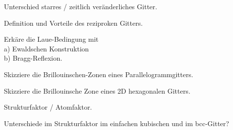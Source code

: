 \documentclass[a5paper,12pt,ngerman,print,grid=front]{kartei}
\begin{document}
	\begin{karte}{
		Unterschied starres / zeitlich veränderliches Gitter.
		}
		
		
		
	\end{karte}


	\begin{karte}{
		Definition und Vorteile des reziproken Gitters.
		}
		
		
		
	\end{karte}


	\begin{karte}{
		Erkäre die Laue-Bedingung mit \\
		a) Ewaldschen Konstruktion \\
		b) Bragg-Reflexion.
		}
		
		
		
	\end{karte}


	\begin{karte}{
		Skizziere die Brillouinschen-Zonen eines Parallelogrammgitters.
		}
		
		
		
	\end{karte}


	\begin{karte}{
		Skizziere die Brillouinsche Zone eines 2D hexagonalen Gitters.
		}
		
		
		
	\end{karte}


	\begin{karte}{
		Strukturfaktor / Atomfaktor.
		}
		
		
		
	\end{karte}


	\begin{karte}{
		Unterschiede im Strukturfaktor im einfachen kubischen und im bcc-Gitter?
		}
		
		
		
	\end{karte}
\end{document}

